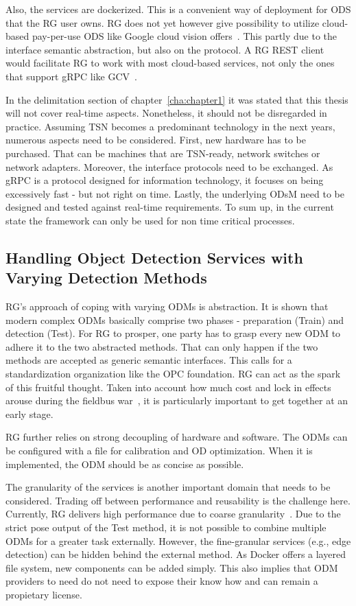 Also, the services are dockerized. This is a convenient way of deployment for ODS that the RG user owns. RG does not yet however give possibility to utilize cloud-based pay-per-use ODS like Google cloud vision offers~\cite{Google-Cloud-Documentation2019Google2019-04-26}. This partly due to the interface semantic abstraction, but also on the protocol. A RG REST client would facilitate RG to work with most cloud-based services, not only the ones that support gRPC like GCV~\cite{Google-Cloud-Documentation2019Google2019-04-26}.

In the delimitation section of chapter~\ref{cha:chapter1} it was stated that this thesis will not cover real-time aspects. Nonetheless, it should not be disregarded in practice. Assuming TSN becomes a predominant technology in the next years, numerous aspects need to be considered. First, new hardware has to be purchased. That can be machines that are TSN-ready, network switches or network adapters. Moreover, the interface protocols need to be exchanged. As gRPC is a protocol designed for information technology, it focuses on being excessively fast - but not right on time. Lastly, the underlying ODsM need to be designed and tested against real-time requirements. To sum up, in the current state the framework can only be used for non time critical processes.

\subsection{Handling Object Detection Services with Varying Detection Methods}
RG's approach of coping with varying ODMs is abstraction. It is shown that modern complex ODMs basically comprise two phases - preparation (Train) and detection (Test). For RG to prosper, one party has to grasp every new ODM to adhere it to the two abstracted methods. That can only happen if the two methods are accepted as generic semantic interfaces. This calls for a standardization organization like the OPC foundation. RG can act as the spark of this fruitful thought. Taken into account how much cost and lock in effects arouse during the fieldbus war~\cite{Felser2002TheBattles}, it is particularly important to get together at an early stage.

RG further relies on strong decoupling of hardware and software. The ODMs can be configured with a file for calibration and OD optimization. When it is implemented, the ODM should be as concise as possible. 

The granularity of the services is another important domain that needs to be considered. Trading off between performance and reusability is the challenge here. Currently, RG delivers high performance due to coarse granularity~\cite{Rudorfer:2018:CSG:3284557.3284713}. Due to the strict pose output of the Test method, it is not possible to combine multiple ODMs for a greater task externally. However, the fine-granular services (e.g., edge detection) can be hidden behind the external method. As Docker offers a layered file system, new components can be added simply. This also implies that ODM providers to need do not need to expose their know how and can remain a propietary license.
